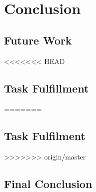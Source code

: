 \chapter{Conclusion}
\label{chp:conclusion} 

\section{Future Work}

<<<<<<< HEAD
\section{Task Fulfillment}
=======
\section{Task Fulfilment}
>>>>>>> origin/master

\section{Final Conclusion}